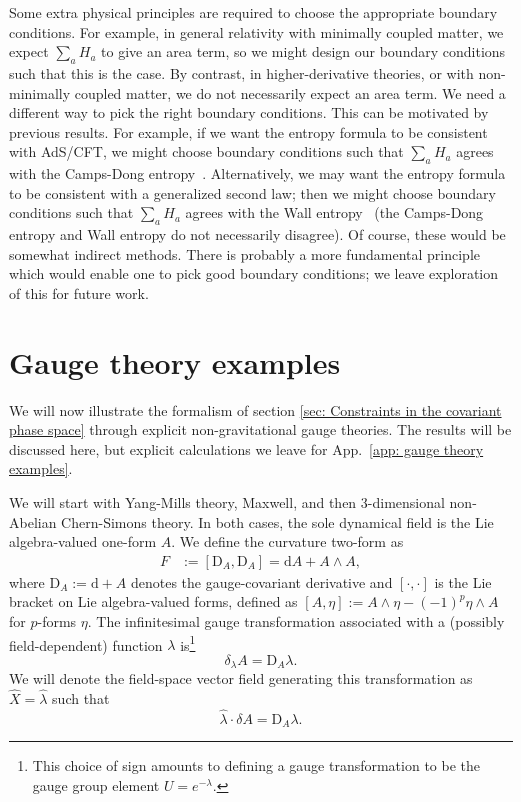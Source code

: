 \documentclass[]{jkpaper}
\theoremstyle{plain}
\theoremstyle{definition}
\newcommand{\fins}{\cdot}
\newcommand{\sd}{\mathrm {d}}
\newcommand{\fd}{\delta}
\newcommand{\DD}[1]{\text{D}_A#1}
\begin{document}
Some extra physical principles are required to choose the appropriate boundary conditions. For example, in general relativity with minimally coupled matter, we expect $\sum_a H_a$ to give an area term, so we might design our boundary conditions such that this is the case. By contrast, in higher-derivative theories, or with non-minimally coupled matter, we do not necessarily expect an area term. We need a different way to pick the right boundary conditions. This can be motivated by previous results. For example, if we want the entropy formula to be consistent with AdS/CFT, we might choose boundary conditions such that $\sum_a H_a$ agrees with the Camps-Dong entropy~\cite{Dong_2014,Camps:2013zua}. Alternatively, we may want the entropy formula to be consistent with a generalized second law; then we might choose boundary conditions such that $\sum_a H_a$ agrees with the Wall entropy~\cite{Wall_2015} (the Camps-Dong entropy and Wall entropy do not necessarily disagree). Of course, these would be somewhat indirect methods. There is probably a more fundamental principle which would enable one to pick good boundary conditions; we leave exploration of this for future work.


\section{Gauge theory examples}
\label{sec: gauge theory examples}

We will now illustrate the formalism of section \ref{sec: Constraints in the covariant phase space} through explicit non-gravitational gauge theories. The results will be discussed here, but explicit calculations we leave for App.~\ref{app: gauge theory examples}. 





We will start with Yang-Mills theory, Maxwell, and then 3-dimensional non-Abelian Chern-Simons theory. In both cases, the sole dynamical field is the Lie algebra-valued one-form $A$. We define the curvature two-form as
\begin{equation}\begin{split}\label{eq: define F}
    F&:=[\DD,\DD]=\sd A + A\wedge A,
\end{split}\end{equation}
where $\DD:=\sd + A$ denotes the gauge-covariant derivative and $[\cdot,\cdot]$ is the Lie bracket on Lie algebra-valued forms, defined as $[A,\eta]:=A\wedge \eta -(-1)^p\eta\wedge A$ for $p$-forms $\eta$. 
The infinitesimal gauge transformation associated with a (possibly field-dependent) function $\lambda$ is\footnote{This choice of sign amounts to defining a gauge transformation to be the gauge group element $U = e^{-\lambda}.$}
\begin{equation}
    \delta_\lambda A = \DD\lambda.
\end{equation}
We will denote the field-space vector field generating this transformation as $\hat{X}=\hat{\lambda}$ such that
\begin{equation}\label{eq: infinitesimal gauge action}
    \hat{\lambda}\fins \fd A = \DD\lambda.
\end{equation}
\end{document}
